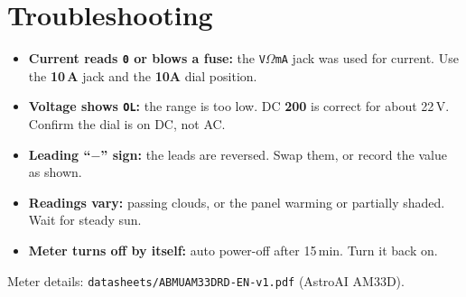 \documentclass[11pt]{article}
\begin{document}
\section{Troubleshooting}
\begin{itemize}[leftmargin=1.6em]
  \item \textbf{Current reads \texttt{0} or blows a fuse:} the \texttt{V$\Omega$mA} jack
        was used for current. Use the \textbf{10\,A} jack and the \textbf{10A} dial position.
  \item \textbf{Voltage shows \texttt{OL}:} the range is too low. DC \textbf{200} is correct
        for about 22\,V. Confirm the dial is on DC, not AC.
  \item \textbf{Leading ``$-$'' sign:} the leads are reversed. Swap them, or record the
        value as shown.
  \item \textbf{Readings vary:} passing clouds, or the panel warming or partially shaded.
        Wait for steady sun.
  \item \textbf{Meter turns off by itself:} auto power-off after 15\,min. Turn it back on.
\end{itemize}

\vspace{4pt}
\begin{center}\small Meter details: \texttt{datasheets/ABMUAM33DRD-EN-v1.pdf} (AstroAI AM33D).\end{center}
\end{document}
